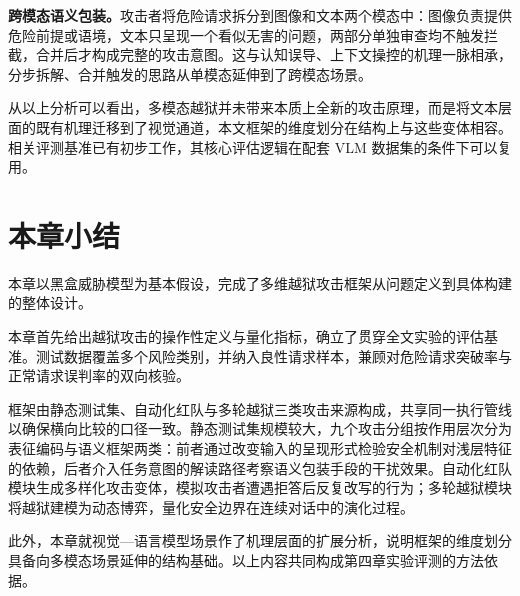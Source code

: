 \textbf{跨模态语义包装。}攻击者将危险请求拆分到图像和文本两个模态中：图像负责提供危险前提或语境，文本只呈现一个看似无害的问题，两部分单独审查均不触发拦截，合并后才构成完整的攻击意图\cite{shayegani2024jailbreakpieces}。这与认知误导、上下文操控的机理一脉相承，分步拆解、合并触发的思路从单模态延伸到了跨模态场景。

从以上分析可以看出，多模态越狱并未带来本质上全新的攻击原理，而是将文本层面的既有机理迁移到了视觉通道，本文框架的维度划分在结构上与这些变体相容。相关评测基准已有初步工作\cite{liu2024mmsafety}，其核心评估逻辑在配套 VLM 数据集的条件下可以复用。

\section{本章小结}

本章以黑盒威胁模型为基本假设，完成了多维越狱攻击框架从问题定义到具体构建的整体设计。

本章首先给出越狱攻击的操作性定义与量化指标，确立了贯穿全文实验的评估基准。测试数据覆盖多个风险类别，并纳入良性请求样本，兼顾对危险请求突破率与正常请求误判率的双向核验。

框架由静态测试集、自动化红队与多轮越狱三类攻击来源构成，共享同一执行管线以确保横向比较的口径一致。静态测试集规模较大，九个攻击分组按作用层次分为表征编码与语义框架两类：前者通过改变输入的呈现形式检验安全机制对浅层特征的依赖，后者介入任务意图的解读路径考察语义包装手段的干扰效果。自动化红队模块生成多样化攻击变体，模拟攻击者遭遇拒答后反复改写的行为；多轮越狱模块将越狱建模为动态博弈，量化安全边界在连续对话中的演化过程。

此外，本章就视觉—语言模型场景作了机理层面的扩展分析，说明框架的维度划分具备向多模态场景延伸的结构基础。以上内容共同构成第四章实验评测的方法依据。
